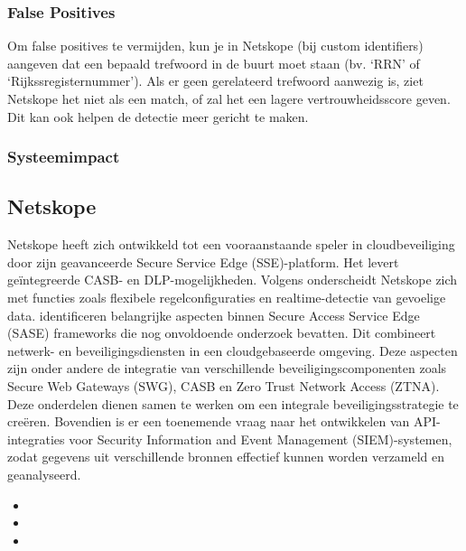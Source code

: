 
\subsubsection{False Positives}


Om false positives te vermijden, kun je in Netskope (bij custom identifiers) aangeven dat een bepaald trefwoord in de buurt moet staan (bv. `RRN' of `Rijkssregisternummer'). 
Als er geen gerelateerd trefwoord aanwezig is, ziet Netskope het niet als een match, of zal het een lagere vertrouwheidsscore geven.
Dit kan ook helpen de detectie meer gericht te maken.

\subsubsection{Systeemimpact}


\subsection{Netskope}%

Netskope heeft zich ontwikkeld tot een vooraanstaande speler in cloudbeveiliging door zijn geavanceerde Secure Service Edge (SSE)-platform. 
Het levert geïntegreerde CASB- en DLP-mogelijkheden. 
Volgens \textcite{Riley2018} onderscheidt Netskope zich met functies zoals flexibele regelconfiguraties en realtime-detectie van gevoelige data. 
\textcite{VanDerWalt2022} identificeren belangrijke aspecten binnen Secure Access Service Edge (SASE) frameworks die nog onvoldoende onderzoek bevatten. 
Dit combineert netwerk- en beveiligingsdiensten in een cloudgebaseerde omgeving. 
Deze aspecten zijn onder andere de integratie van verschillende beveiligingscomponenten zoals Secure Web Gateways (SWG), CASB en Zero Trust Network Access (ZTNA). 
Deze onderdelen dienen samen te werken om een integrale beveiligingsstrategie te creëren. 
Bovendien is er een toenemende vraag naar het ontwikkelen van API-integraties voor Security Information and Event Management (SIEM)-systemen, 
zodat gegevens uit verschillende bronnen effectief kunnen worden verzameld en geanalyseerd.


\begin{itemize}
    \item
    \item 
    \item 
\end{itemize}

